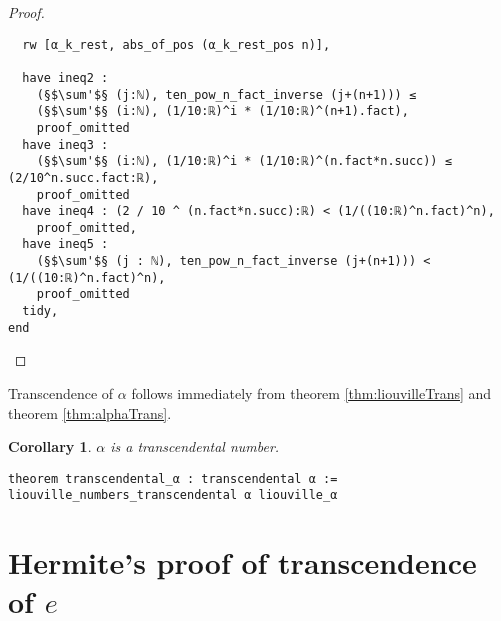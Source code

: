 \documentclass{report}
\theoremstyle{definition}
\theoremstyle{plain}
\newtheorem{corollary}{Corollary}[section]
\begin{document}
\begin{proof}
\begin{verbatim}
  rw [α_k_rest, abs_of_pos (α_k_rest_pos n)],

  have ineq2 : 
    (§$\sum'$§ (j:ℕ), ten_pow_n_fact_inverse (j+(n+1))) ≤ 
    (§$\sum'$§ (i:ℕ), (1/10:ℝ)^i * (1/10:ℝ)^(n+1).fact),
    proof_omitted
  have ineq3 : 
    (§$\sum'$§ (i:ℕ), (1/10:ℝ)^i * (1/10:ℝ)^(n.fact*n.succ)) ≤ (2/10^n.succ.fact:ℝ),
    proof_omitted
  have ineq4 : (2 / 10 ^ (n.fact*n.succ):ℝ) < (1/((10:ℝ)^n.fact)^n),
    proof_omitted,
  have ineq5 : 
    (§$\sum'$§ (j : ℕ), ten_pow_n_fact_inverse (j+(n+1))) < (1/((10:ℝ)^n.fact)^n),
    proof_omitted
  tidy,
end
\end{verbatim}
\end{proof}

Transcendence of $\alpha$ follows immediately from theorem \ref{thm:liouvilleTrans} and theorem \ref{thm:alphaTrans}.
\begin{corollary}
$\alpha$ is a transcendental number.

\begin{verbatim}
theorem transcendental_α : transcendental α := liouville_numbers_transcendental α liouville_α 
\end{verbatim}
\end{corollary}

\section{Hermite's proof of transcendence of $e$}\label{fmlsn:e}



%


\nocite{*}
\printbibliography[heading=bibintoc]

\end{document}
